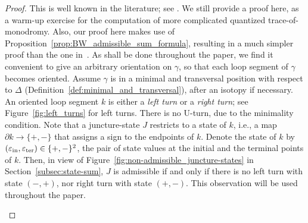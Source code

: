 \documentclass[pdftex]{sigma}
\numberwithin{equation}{section}
\theoremstyle{definition}
\begin{document}
\begin{proof} This is well known in the literature; see \cite[Lemma~3.24]{AK}. We still provide a proof here, as a warm-up exercise for the computation of more complicated quantized trace-of-monodromy. Also, our proof here makes use of Proposition~\ref{prop:BW_admissible_sum_formula}, resulting in a much simpler proof than the one in~\cite{AK}.
As shall be done throughout the paper, we find it convenient to give an arbitrary orientation on $\gamma$, so that each loop segment of $\gamma$ becomes oriented. Assume $\gamma$ is in a minimal and transversal position with respect to $\Delta$ (Definition~\ref{def:minimal_and_transversal}), after an isotopy if necessary. An oriented loop segment $k$ is either a {\em left turn} or a {\em right turn}; see Figure~\ref{fig:left_turns} for left turns. There is no U\nobreakdash-turn, due to the minimality condition. Note that a juncture-state $J$ restricts to a state of $k$, i.e., a map $\partial k \to \{+,-\}$ that assigns a sign to the endpoints of $k$. Denote the state of $k$ by $(\varepsilon_{\rm in}, \varepsilon_{\rm ter}) \in \{+,-\}^2$, the pair of state values at the initial and the terminal points of $k$. Then, in view of Figure~\ref{fig:non-admissible_juncture-states} in Section~\ref{subsec:state-sum}, $J$ is admissible if and only if there is no left turn with state $(-,+)$, nor right turn with state $(+,-)$. This observation will be used throughout the paper.
\begin{figure}
\centering\hspace*{-15mm}
\begin{subfigure}[b]{0.33\textwidth}\centering
 \scalebox{0.7}{%
}
\end{subfigure}
\end{figure}
\end{proof}
\end{document}
